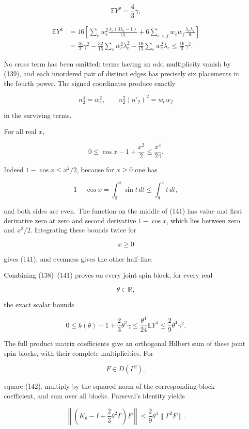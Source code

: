 \documentclass[
  11pt,
]{article}
\begin{document}
\[
 \mathbb E Y^2=\frac43\gamma,
\]

\[
 \begin{aligned}
 \mathbb E Y^4
 &=16\left[
 \sum_ew_e^2\frac{\lambda_e(3\lambda_e-1)}{15}
 +6\sum_{e<f}w_ew_f\frac{\lambda_e\lambda_f}{9}
 \right]\\
 &=\frac{16}{3}\gamma^2
 -\frac{32}{15}\sum_ew_e^2\lambda_e^2
 -\frac{16}{15}\sum_ew_e^2\lambda_e
 \le\frac{16}{3}\gamma^2.
 \end{aligned}
\tag{140}
\]

No cross term has been omitted: terms having an odd multiplicity vanish
by (139), and each unordered pair of distinct edges has precisely six
placements in the fourth power. The signed coordinates produce exactly

\[
 n_2^4=w_e^2,\qquad n_2^2(n'_2)^2=w_ew_f
\]

in the surviving terms.

For all real \(x\),

\[
 0\le\cos x-1+\frac{x^2}{2}\le\frac{x^4}{24}.
\tag{141}
\]

Indeed \(1-\cos x\le x^2/2\), because for \(x\ge0\) one has

\[
 1-\cos x=\int_0^x\sin t\,dt\le\int_0^xt\,dt,
\]

and both sides are even. The function on the middle of (141) has value
and first derivative zero at zero and second derivative \(1-\cos x\),
which lies between zero and \(x^2/2\). Integrating these bounds twice
for

\[
 x\ge0
\]

gives (141), and evenness gives the other half-line.

Combining (138)--(141) proves on every joint spin block, for every real

\[
 \theta\in\mathbb R,
\]

the exact scalar bounds

\[
 0\le k(\theta)-1+\frac23\theta^2\gamma
 \le\frac{\theta^4}{24}\mathbb E Y^4
 \le\frac29\theta^4\gamma^2.
\tag{142}
\]

The full product matrix coefficients give an orthogonal Hilbert sum of
these joint spin blocks, with their complete multiplicities. For

\[
 F\in D(\Gamma^2),
\]

square (142), multiply by the squared norm of the corresponding block
coefficient, and sum over all blocks. Parseval's identity yields

\[
 \boxed{
 \left\|\left(K_\theta-I+\frac23\theta^2\Gamma\right)F\right\|
 \le\frac29\theta^4\|\Gamma^2F\|.}
\tag{143}
\]
\end{document}
